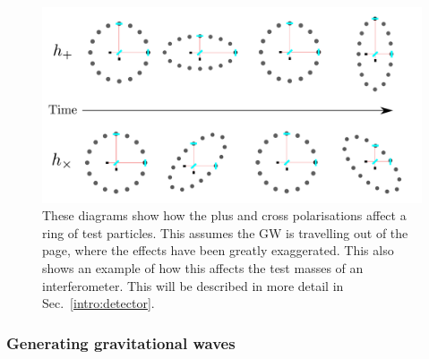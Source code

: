 \begin{figure}[h]
    \centering
    \includegraphics[width=\textwidth]{C1_intro/polarisation_ring.pdf}
 \caption[Plus and Cross polarisations]{These diagrams show how the plus and cross
polarisations affect a ring of test particles. This assumes
the \gls{GW} is travelling out of the page, where the effects
have been greatly exaggerated. This also shows an example of how this
affects the test masses of an interferometer. This will be
described in more detail in Sec.~\ref{intro:detector}.}
\label{gw:polarisations}
\end{figure}



\subsubsection{Generating gravitational waves}

